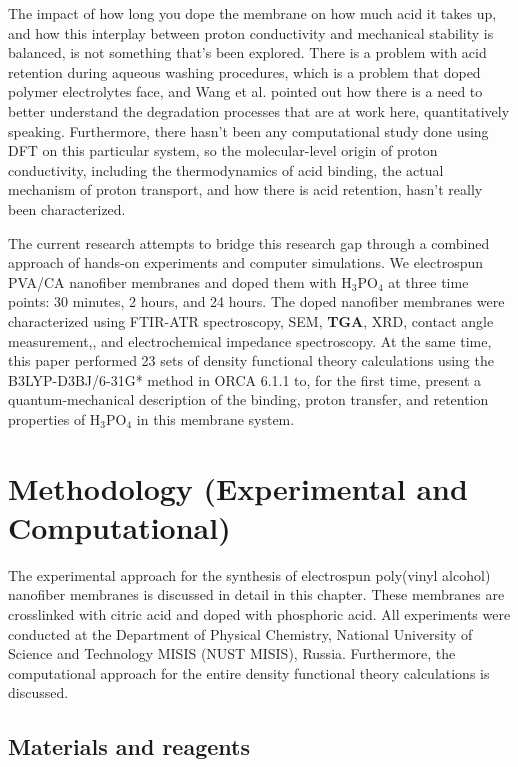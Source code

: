 \documentclass[12pt,a4paper]{report}
\begin{document}
The impact of how long you dope the membrane on how much acid it takes up, and how this interplay between proton conductivity and mechanical stability is balanced, is not something that’s been explored. There is a problem with acid retention during aqueous washing procedures, which is a problem that doped polymer electrolytes face, \cite{35} and Wang et al. pointed out how there is a need to better understand the degradation processes that are at work here, quantitatively speaking.\cite{58} Furthermore, there hasn’t been any computational study done using DFT on this particular system, so the molecular-level origin of proton conductivity, including the thermodynamics of acid binding, the actual mechanism of proton transport, and how there is acid retention, hasn’t really been characterized.

The current research attempts to bridge this research gap through a combined approach of hands-on experiments and computer simulations. We electrospun PVA/CA nanofiber membranes and doped them with H\(_3\)PO\(_4\) at three time points: 30 minutes, 2 hours, and 24 hours. The doped nanofiber membranes were characterized using FTIR-ATR spectroscopy, SEM, \textbf{TGA}, XRD, contact angle measurement,, and electrochemical impedance spectroscopy. At the same time, this paper performed 23 sets of density functional theory calculations using the B3LYP-D3BJ/6-31G* method in ORCA 6.1.1 to, for the first time, present a quantum-mechanical description of the binding, proton transfer, and retention properties of H\(_3\)PO\(_4\) in this membrane system.\cite{21,79}


\chapter{Methodology (Experimental and Computational)}

The experimental approach for the synthesis of electrospun poly(vinyl alcohol) nanofiber membranes is discussed in detail in this chapter. These membranes are crosslinked with citric acid and doped with phosphoric acid. All experiments were conducted at the Department of Physical Chemistry, National University of Science and Technology MISIS (NUST MISIS), Russia. Furthermore, the computational approach for the entire density functional theory calculations is discussed.

\section{Materials and reagents}
\end{document}
